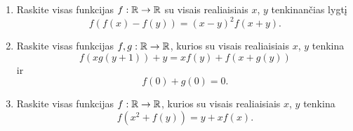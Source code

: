 \begin{enumerate}
  \item Raskite visas funkcijas $f: \mathbb R \to \mathbb R$ su visais realiaisiais $x$,
    $y$ tenkinančias lygtį $$f(f(x)-f(y))=(x-y)^2f(x+y).$$
  \item Raskite visas funkcijas $f,g:\mathbb R\to\mathbb R$, kurios su visais
    realiaisiais $x$, $y$ tenkina $$f(xg(y+1))+y=xf(y) + f(x+g(y))$$ ir
    $$f(0)+g(0)=0.$$
   \item Raskite visas funkcijas $f:\mathbb R\to\mathbb R$, kurios su visais realiaisiais
    $x$, $y$ tenkina $$f(x^2 + f(y)) = y + xf(x).$$

\end{enumerate}
